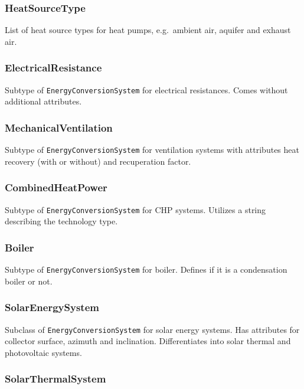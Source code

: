 \documentclass[a4paper,12pt]{article}
\begin{document}
\subsubsection{HeatSourceType}\label{heatsourcetype}

List of heat source types for heat pumps, e.g.~ambient air, aquifer and
exhaust air.

\subsubsection{ElectricalResistance}\label{electricalresistance}

Subtype of \lstinline!EnergyConversionSystem! for electrical
resistances. Comes without additional attributes.

\subsubsection{MechanicalVentilation}\label{mechanicalventilation}

Subtype of \lstinline!EnergyConversionSystem! for ventilation systems
with attributes heat recovery (with or without) and recuperation factor.

\subsubsection{CombinedHeatPower}\label{combinedheatpower}

Subtype of \lstinline!EnergyConversionSystem! for CHP systems. Utilizes
a string describing the technology type.

\subsubsection{Boiler}\label{boiler}

Subtype of \lstinline!EnergyConversionSystem! for boiler. Defines if it
is a condensation boiler or not.

\subsubsection{SolarEnergySystem}\label{solarenergysystem}

Subclass of \lstinline!EnergyConversionSystem! for solar energy systems.
Has attributes for collector surface, azimuth and inclination.
Differentiates into solar thermal and photovoltaic systems.

\subsubsection{SolarThermalSystem}\label{solarthermalsystem}
\end{document}
